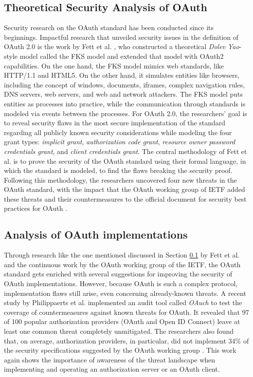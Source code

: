 \subsection{Theoretical Security Analysis of OAuth}
\label{subsec:fks_model}
Security research on the OAuth standard has been conducted since its beginnings. Impactful research that unveiled security issues in the definition of OAuth 2.0 is the work by Fett et al. \cite{fett2016comprehensive}, who constructed a theoretical \emph{Dolev Yao}-style model called the FKS model and extended that model with OAuth2 capabilities. On the one hand, the FKS model mimics web standards, like HTTP/1.1 and HTML5. On the other hand, it simulates entities like browsers, including the concept of windows, documents, iframes, complex navigation rules, DNS servers, web servers, and web and network attackers. The FKS model puts entities as processes into practice, while the communication through standards is modeled via events between the processes. For OAuth 2.0, the researchers' goal is to reveal security flaws in the most secure implementation of the standard regarding all publicly known security considerations while modeling the four grant types: \emph{implicit grant}, \emph{authorization code grant}, \emph{resource owner password credentials grant}, and \emph{client credentials grant}. The central methodology of Fett et al. is to prove the security of the OAuth standard using their formal language, in which the standard is modeled, to find the flaws breaking the security proof. Following this methodology, the researchers uncovered four new threats in the  OAuth standard, with the impact that the OAuth working group of IETF added these threats and their countermeasures to the official document for security best practices for OAuth \cite{lodderstedt2020oauth}.

\subsection{Analysis of OAuth implementations}
Through research like the one mentioned discussed in Section \ref{subsec:fks_model} by Fett et al. and the continuous work by the OAuth working group of the IETF, the OAuth standard gets enriched with several suggestions for improving the security of OAuth implementations. However, because OAuth is such a complex protocol, implementation flaws still arise, even concerning already-known threats. A recent study by Philippaerts et al. implemented an audit tool called \emph{OAuch} to test the coverage of countermeasures against known threats for OAuth. It revealed that 97 of 100 popular authorization providers (OAuth and Open ID Connect) leave at least one common threat completely unmitigated. The researchers also found that, on average, authorization providers, in particular, did not implement 34\% of the security specifications suggested by the OAuth working group \cite{philippaerts2022oauch}. This work again shows the importance of awareness of the threat landscape when implementing and operating an authorization server or an OAuth client.

